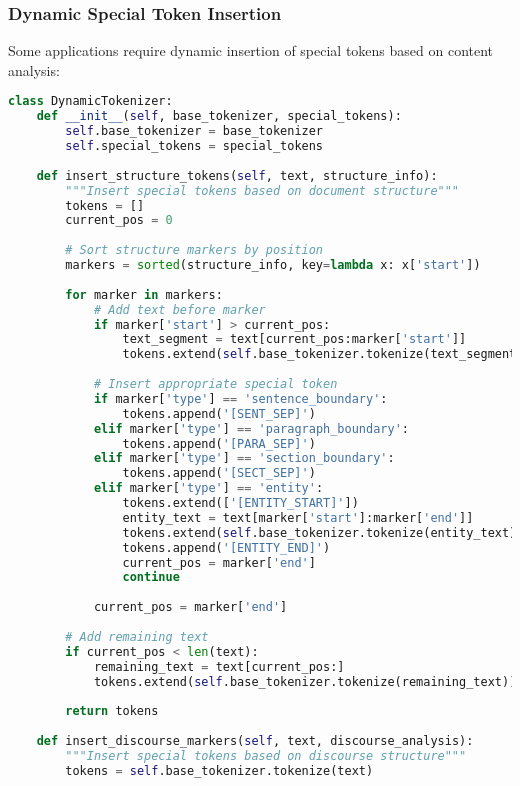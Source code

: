 \subsubsection{Dynamic Special Token Insertion}

Some applications require dynamic insertion of special tokens based on content analysis:

\begin{lstlisting}[language=Python, caption=Dynamic special token insertion]
class DynamicTokenizer:
    def __init__(self, base_tokenizer, special_tokens):
        self.base_tokenizer = base_tokenizer
        self.special_tokens = special_tokens
        
    def insert_structure_tokens(self, text, structure_info):
        """Insert special tokens based on document structure"""
        tokens = []
        current_pos = 0
        
        # Sort structure markers by position
        markers = sorted(structure_info, key=lambda x: x['start'])
        
        for marker in markers:
            # Add text before marker
            if marker['start'] > current_pos:
                text_segment = text[current_pos:marker['start']]
                tokens.extend(self.base_tokenizer.tokenize(text_segment))
            
            # Insert appropriate special token
            if marker['type'] == 'sentence_boundary':
                tokens.append('[SENT_SEP]')
            elif marker['type'] == 'paragraph_boundary':
                tokens.append('[PARA_SEP]')
            elif marker['type'] == 'section_boundary':
                tokens.append('[SECT_SEP]')
            elif marker['type'] == 'entity':
                tokens.extend(['[ENTITY_START]'])
                entity_text = text[marker['start']:marker['end']]
                tokens.extend(self.base_tokenizer.tokenize(entity_text))
                tokens.append('[ENTITY_END]')
                current_pos = marker['end']
                continue
                
            current_pos = marker['end']
        
        # Add remaining text
        if current_pos < len(text):
            remaining_text = text[current_pos:]
            tokens.extend(self.base_tokenizer.tokenize(remaining_text))
            
        return tokens
    
    def insert_discourse_markers(self, text, discourse_analysis):
        """Insert special tokens based on discourse structure"""
        tokens = self.base_tokenizer.tokenize(text)
        

\end{lstlisting}
